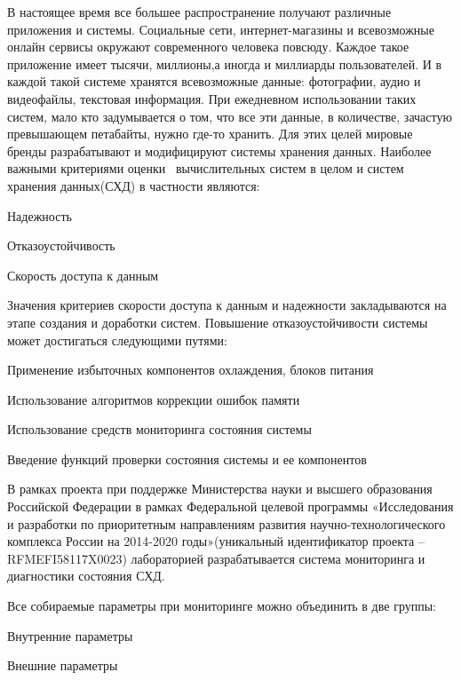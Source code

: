 \intro

В настоящее время все большее распространение получают различные приложения и системы. Социальные сети, интернет-магазины и всевозможные онлайн сервисы окружают современного человека повсюду. Каждое такое приложение имеет тысячи, миллионы,а иногда и миллиарды пользователей. И в каждой такой системе хранятся всевозможные данные: фотографии,  аудио и видеофайлы, текстовая информация. При ежедневном использовании таких систем, мало кто задумывается о том, что все эти данные, в количестве, зачастую превышающем петабайты, нужно где-то хранить. Для этих целей мировые бренды разрабатывают и модифицируют системы хранения данных. Наиболее важными критериями оценки~\cite{reliability} вычислительных систем в целом и систем хранения данных(СХД) в частности являются: 
\begin{itemize*}
	\item{Надежность}
	\item{Отказоустойчивость}
	\item{Скорость доступа к данным}
\end{itemize*}	
Значения критериев скорости доступа к данным и надежности закладываются на этапе создания и доработки систем. Повышение отказоустойчивости системы может достигаться следующими путями:
\begin{itemize*}
	\item{Применение избыточных компонентов охлаждения, блоков питания}
	\item{Использование алгоритмов коррекции ошибок памяти}
	\item{Использование средств мониторинга состояния системы}
	\item{Введение функций проверки состояния системы и ее компонентов}
\end{itemize*}	

В рамках проекта при поддержке Министерства науки и высшего образования Российской Федерации  в рамках Федеральной целевой программы «Исследования и разработки по приоритетным направлениям развития научно-технологического комплекса России на 2014-2020 годы»(уникальный идентификатор проекта  – RFMEFI58117X0023) лабораторией разрабатывается система мониторинга и диагностики состояния СХД.

Все собираемые параметры при мониторинге можно объединить в две группы: 
\begin{itemize*}
	\item{Внутренние параметры}
	\item{Внешние параметры}
\end{itemize*}	

